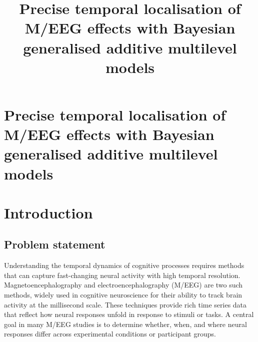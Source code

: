 \documentclass[
  man,
  floatsintext,
  longtable,
  a4paper,
  nolmodern,
  notxfonts,
  notimes,
  colorlinks=true,linkcolor=blue,citecolor=blue,urlcolor=blue]{apa7}
\title{Precise temporal localisation of M/EEG effects with Bayesian
generalised additive multilevel models}
\begin{document}
\maketitle

\hypertarget{toc}{}
\tableofcontents
\newpage
\section[Introduction]{Precise temporal localisation of M/EEG effects
with Bayesian generalised additive multilevel models}

\setcounter{secnumdepth}{-\maxdimen} %

\setlength\LTleft{0pt}

\resetlinenumber[1]

\section{Introduction}\label{introduction}

\subsection{Problem statement}\label{problem-statement}

Understanding the temporal dynamics of cognitive processes requires
methods that can capture fast-changing neural activity with high
temporal resolution. Magnetoencephalography and electroencephalography
(M/EEG) are two such methods, widely used in cognitive neuroscience for
their ability to track brain activity at the millisecond scale. These
techniques provide rich time series data that reflect how neural
responses unfold in response to stimuli or tasks. A central goal in many
M/EEG studies is to determine whether, when, and where neural responses
differ across experimental conditions or participant groups.
\end{document}
